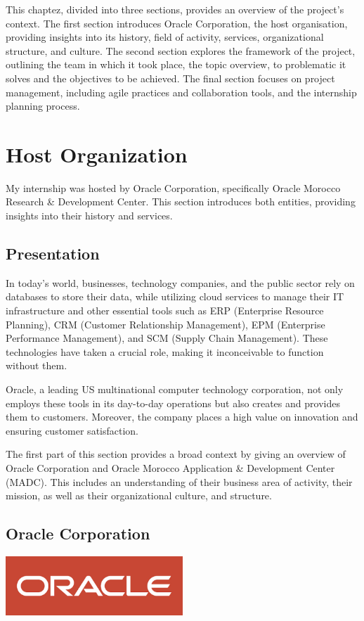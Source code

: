 This chaptez, divided into three sections, provides an overview of the project’s context. The first section introduces Oracle Corporation, the host organisation, providing insights into its history, field of activity, services, organizational structure, and culture. The second section explores the framework of the project, outlining the team in which it took place, the topic overview, to problematic it solves and the objectives to be achieved. The final section focuses on project management, including agile practices and collaboration tools, and the internship planning process.
\newpage
{}

\section{Host Organization}

My internship was hosted by Oracle Corporation, specifically Oracle Morocco Research \& Development Center. This section introduces both entities, providing insights into their history and services.

\subsection{Presentation}
In today's world, businesses, technology companies, and the public sector rely on databases to store their data, while utilizing cloud services to manage their IT infrastructure and other essential tools such as ERP (Enterprise Resource Planning), CRM (Customer Relationship Management), EPM (Enterprise Performance Management), and SCM (Supply Chain Management). These technologies have taken a crucial role, making it inconceivable to function without them.\mynewline

Oracle, a leading US multinational computer technology corporation, not only employs these tools in its day-to-day operations but also creates and provides them to customers. Moreover, the company places a high value on innovation and ensuring customer satisfaction.\mynewline

The first part of this section provides a broad context by giving an overview of Oracle Corporation and Oracle Morocco Application \& Development Center (MADC). This includes an understanding of their business area of activity, their mission, as well as their organizational culture, and structure.

\subsection{Oracle Corporation}
\begin{center}
    \centering
    \includegraphics[width=0.5\textwidth]{Images/oracle_corp_logo.jpg}
     \cite{O-History}
    \label{fig:oracle}
\end{center}

